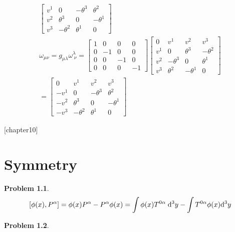 \documentclass{report}
\theoremstyle{definition}
\begin{document}
\begin{chapter9}
\begin{gather*}
\begin{bmatrix}
			v^1 & 0 & -\theta^3 & \theta^2 \\
			v^2 & \theta^3 & 0 & -\theta^1 \\
			v^3 & -\theta^2 & \theta^1 & 0
		\end{bmatrix} \\
		\omega_{\mu\nu} = g_{\mu\lambda}\omega^{\lambda}_{\;\nu} =
		\begin{bmatrix}
			1 & 0 & 0 & 0 \\
			0 & -1 & 0 & 0 \\
			0 & 0 & -1 & 0 \\
			0 & 0 & 0 & -1 
		\end{bmatrix}
		\begin{bmatrix}
			0 & v^1 & v^2 & v^3 \\
			v^1 & 0 & \theta^3 & -\theta^2 \\
			v^2 & -\theta^3 & 0 & \theta^1 \\
			v^3 & \theta^2 & -\theta^1 & 0
		\end{bmatrix} \\
		=
		\begin{bmatrix}
			0 & v^1 & v^2 & v^3 \\
			-v^1 & 0 & -\theta^3 & \theta^2 \\
			-v^2 & \theta^3 & 0 & -\theta^1 \\
			-v^3 & -\theta^2 & \theta^1 & 0
		\end{bmatrix}
	\end{gather*}
\end{chapter9}

\newtheorem{chapter10}{Problem}
[chapter10]
\chapter{Symmetry}

\begin{chapter10}
	\begin{gather*}
		\bqty{\phi(x),P^{\alpha}} = \phi(x)P^{\alpha} - P^{\alpha}\phi(x) =  \int \phi(x) T^{0\alpha}\;\dd^3{y} - \int T^{0\alpha}\phi(x) \dd^3{y}
	\end{gather*}
\end{chapter10}

\begin{chapter10}
	
\end{chapter10}
\end{document}
